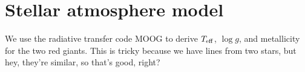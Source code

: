 \section{Stellar atmosphere model}\label{atm}
We use the radiative transfer code MOOG \citep{sne73} to derive $T_{\rm{eff}}$, $\log g$, and metallicity for the two red giants. This is tricky because we have lines from two stars, but hey, they're similar, so that's good, right?